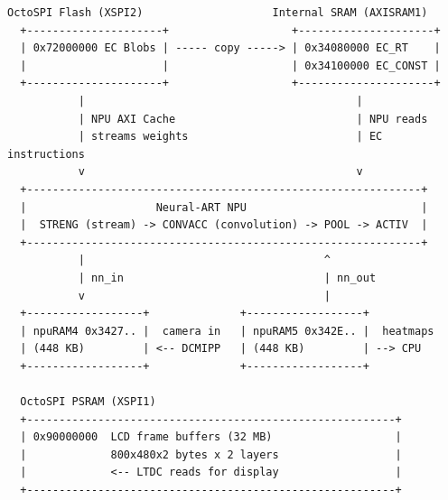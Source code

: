 \begin{lstlisting}[language={}, caption={Datenfluss der Inferenz-Pipeline}, label={lst:datenfluss}, numbers=none]
  OctoSPI Flash (XSPI2)                    Internal SRAM (AXISRAM1)
  +---------------------+                   +---------------------+
  | 0x72000000 EC Blobs | ----- copy -----> | 0x34080000 EC_RT    |
  |                     |                   | 0x34100000 EC_CONST |
  +---------------------+                   +---------------------+
           |                                          |
           | NPU AXI Cache                            | NPU reads
           | streams weights                          | EC instructions
           v                                          v
  +-------------------------------------------------------------+
  |                    Neural-ART NPU                           |
  |  STRENG (stream) -> CONVACC (convolution) -> POOL -> ACTIV  |
  +-------------------------------------------------------------+
           |                                     ^
           | nn_in                               | nn_out
           v                                     |
  +------------------+              +------------------+
  | npuRAM4 0x3427.. |  camera in   | npuRAM5 0x342E.. |  heatmaps
  | (448 KB)         | <-- DCMIPP   | (448 KB)         | --> CPU
  +------------------+              +------------------+

  OctoSPI PSRAM (XSPI1)
  +---------------------------------------------------------+
  | 0x90000000  LCD frame buffers (32 MB)                   |
  |             800x480x2 bytes x 2 layers                  |
  |             <-- LTDC reads for display                  |
  +---------------------------------------------------------+
\end{lstlisting}


